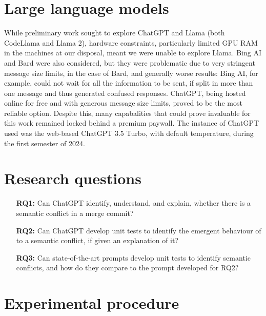 \section{Large language models}


While preliminary work sought to explore ChatGPT and Llama (both CodeLlama and Llama 2), hardware constraints, particularly limited GPU RAM in the machines at our disposal, meant we were unable to explore Llama.  Bing AI and Bard were also considered, but they were problematic due to very stringent message size limits, in the case of Bard, and generally worse results: Bing AI, for example, could not wait for all the information to be sent, if split in more than one message and thus generated confused responses. ChatGPT, being hosted online for free and with generous message size limits, proved to be the most reliable option. Despite this, many capabalities that could prove invaluable for this work remained locked behind a premium paywall.
The instance of ChatGPT used was the web-based ChatGPT 3.5 Turbo, with default temperature, during the first semester of 2024.

\section{Research questions}

\begin{itemize}
  \item[\textbf{RQ1:}] Can ChatGPT identify, understand, and explain, whether
  there is a semantic conflict in a merge commit?

  \item[\textbf{RQ2:}] Can ChatGPT develop unit tests to identify the emergent behaviour of to a semantic conflict, if given an explanation of it?
  
  \item[\textbf{RQ3:}] Can state-of-the-art prompts develop unit tests to identify semantic conflicts, and how do they compare to the prompt developed for RQ2?
\end{itemize}

\section{Experimental procedure}

